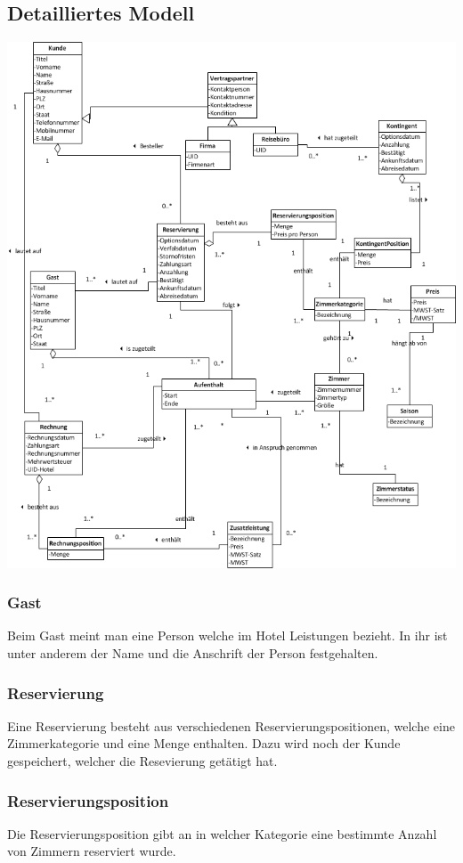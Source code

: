 \documentclass[10pt,a4paper,titlepage]{article}
\begin{document}
\subsection{Detailliertes Modell}
\includegraphics[width=\linewidth]{Images/Domaenenmodell.png}
\subsubsection{Gast}
Beim Gast meint man eine Person welche im Hotel Leistungen bezieht. In ihr ist unter anderem der Name und die Anschrift der Person festgehalten.
\subsubsection{Reservierung}
Eine Reservierung besteht aus verschiedenen Reservierungspositionen, welche eine Zimmerkategorie und eine Menge enthalten. Dazu wird noch der Kunde gespeichert, welcher die Resevierung getätigt hat.
\subsubsection{Reservierungsposition}
Die Reservierungsposition gibt an in welcher Kategorie eine bestimmte Anzahl von
Zimmern reserviert wurde.
\end{document}

